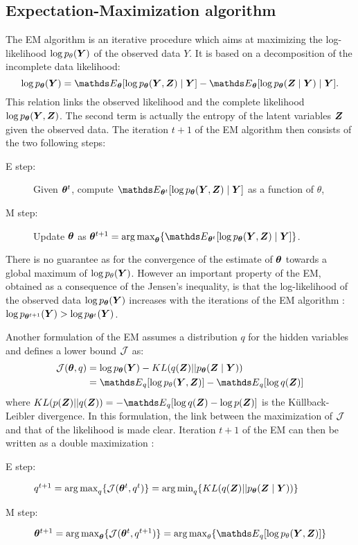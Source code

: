  \subsection{Expectation-Maximization algorithm}
 The EM algorithm is an iterative procedure which aims at maximizing the log-likelihood $\log p_\theta({\boldsymbol{Y}})$ of the observed data $Y$. It is based on a decomposition of the incomplete data likelihood:
 $$\log p_{\thetab} (\Ybf) = \Esp_\thetab [\log p_{\thetab} (\Ybf,\Zbf)\mid\Ybf] - \Esp_\thetab [\log p_{\thetab} (\Zbf\mid\Ybf) \mid \Ybf]. $$
This relation links the observed likelihood and the complete likelihood $\log p_{{\boldsymbol{\theta}}} ({\boldsymbol{Y}},{\boldsymbol{Z}})$. The second term is actually the entropy of the latent variables ${\boldsymbol{Z}}$ given the observed data.
The iteration $t+1$ of the EM algorithm then consists of the two following steps:
 \begin{description}
 \item [E step:] Given ${\boldsymbol{\theta}}^t$, compute $\Esp_{\thetab^t}[\log p_\thetab (\Ybf, \Zbf)\mid \Ybf]$ as a function of $\theta$,
 \item [M step:] Update ${\boldsymbol{\theta}}$ as $\thetab^{t+1} = \argmax_\thetab \{ \Esp_{\thetab^t}[\log p_\thetab (\Ybf, \Zbf)\mid \Ybf]\}$.
 \end{description} 
There is no guarantee as for the convergence of the estimate of ${\boldsymbol{\theta}}$ towards a global maximum of $\log p_\theta({\boldsymbol{Y}})$. However an important property of the EM, obtained as a consequence of the Jensen's inequality,  is that the log-likelihood of the observed data $\log p_{{\boldsymbol{\theta}}} ({\boldsymbol{Y}})$ increases with the iterations of the EM algorithm \citep{DLR77}: $\log p_{{\boldsymbol{\theta}}^{t+1}} ({\boldsymbol{Y}}) > \log p_{{\boldsymbol{\theta}}^t} ({\boldsymbol{Y}})$.
 
 Another formulation of the EM assumes a distribution $q$ for the hidden variables \citep{NH98} and defines a  lower bound ${\mathcal{J}}$ as:
\begin{align*}
\bound(\thetabf, q) &= \log p_\thetab (\Ybf) - KL(q(\Zbf) || p_\thetab(\Zbf\mid\Ybf))\\
&=\Esp_q [\log p_\theta (\Ybf,\Zbf)] - \Esp_q[\log q(\Zbf)]
\end{align*}
 where $KL(p(\Zbf)||q(\Zbf)) = -\Esp_q[\log q(\Zbf) - \log p(\Zbf)]$ is the Küllback-Leibler divergence. In this formulation, the link between the maximization of ${\mathcal{J}}$ and that of the likelihood is made clear. Iteration $t+1$ of the EM can then be written as a double maximization :
  \begin{description}
 \item [E step:]  $q^{t+1}=\operatorname*{arg\,max}_q \{ {\mathcal{J}}({\boldsymbol{\theta}}^t, q^t)\} = \operatorname*{arg\,min}_q \{ KL(q({\boldsymbol{Z}}) || p_{\boldsymbol{\theta}}({\boldsymbol{Z}}\mid{\boldsymbol{Y}}))\}$
 \item [M step:] $\thetab^{t+1} = \argmax_\thetab \{ \bound(\thetabf^t, q^{t+1})\} = \argmax_\theta \{ \Esp_q [\log p_\theta (\Ybf,\Zbf)]\}$
 \end{description} 

